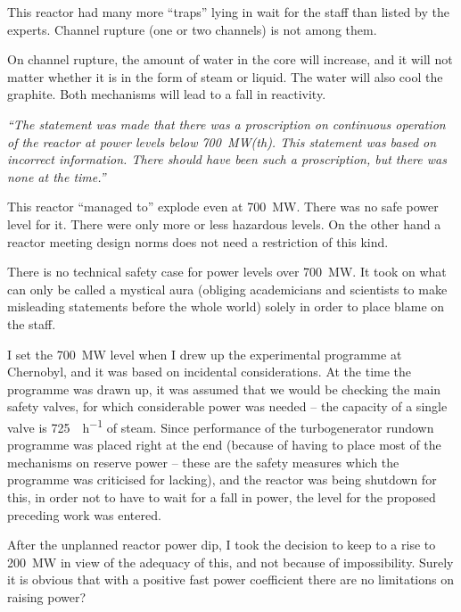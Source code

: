 \documentclass[openright]{bookest}
\begin{document}
This reactor had many more ``traps'' lying in wait for the staff than listed by the experts. Channel rupture (one or two channels) is not among them.

On channel rupture, the amount of water in the core will increase, and it will not matter whether it is in the form of steam or liquid. The water will also cool the graphite. Both mechanisms will lead to a fall in reactivity.

\begin{personal}[INSAG-7 (§5.2.1):]
\textit{``The statement was made that there was a proscription on continuous operation of the reactor at power levels below \qty{700}{\mega\watt}(th). This statement was based on incorrect information. There should have been such a proscription, but there was none at the time.''}
\end{personal}

This reactor ``managed to'' explode even at \qty{700}{\mega\watt}. There was no safe power level for it. There were only more or less hazardous levels. On the other hand a reactor meeting design norms does not need a restriction of this kind.

There is no technical safety case for power levels over \qty{700}{\mega\watt}. It took on what can only be called a mystical aura (obliging academicians and scientists to make misleading statements before the whole world) solely in order to place blame on the staff.

I set the \qty{700}{\mega\watt} level when I drew up the experimental programme at Chernobyl, and it was based on incidental considerations. At the time the programme was drawn up, it was assumed that we would be checking the main safety valves, for which considerable power was needed -- the capacity of a single valve is \qty{725}{\ton\per\hour} of steam. Since performance of the turbogenerator rundown programme was placed right at the end (because of having to place most of the mechanisms on reserve power -- these are the safety measures which the programme was criticised for lacking), and the reactor was being shutdown for this, in order not to have to wait for a fall in power, the level for the proposed preceding work was entered.

After the unplanned reactor power dip, I took the decision to keep to a rise to \qty{200}{\mega\watt} in view of the adequacy of this, and not because of impossibility. Surely it is obvious that with a positive fast power coefficient there are no limitations on raising power?
\end{document}
